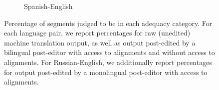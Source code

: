 \begin{figure}
\begin{subfigure}[b]{\linewidth}
\begin{center}
\end{center}
\caption{Spanish-English}
\label{fig:percentage_segments_es}
\end{subfigure}
\caption{Percentage of segments judged to be in each adequacy category. For each language pair, we report percentages for raw (unedited) machine translation output, as well as output post-edited by a bilingual post-editor with access to alignments and without access to alignments. For Russian-English, we additionally report percentages for output post-edited by a monolingual post-editor \citep{2014_WMT_Schwartz_etal} with access to alignments.}
\label{fig:percentage_segments}
\end{figure}
